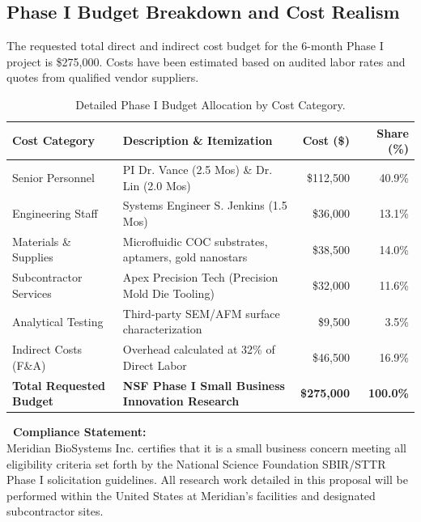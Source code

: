 \documentclass[11pt,a4paper]{scrartcl}
\begin{document}
\subsection{Phase I Budget Breakdown and Cost Realism}

The requested total direct and indirect cost budget for the 6-month Phase I project is \$275,000. Costs have been estimated based on audited labor rates and quotes from qualified vendor suppliers.

\begin{table}[htbp]
\centering
\small
\caption{Detailed Phase I Budget Allocation by Cost Category.}
\vspace{2pt}
\begin{tabularx}{\textwidth}{X X r r}
\toprule
\textbf{\textcolor{NavyBlue}{Cost Category}} & \textbf{\textcolor{NavyBlue}{Description \& Itemization}} & \textbf{\textcolor{NavyBlue}{Cost (\$)}} & \textbf{\textcolor{NavyBlue}{Share (\%)}} \\
\midrule
Senior Personnel & PI Dr. Vance (2.5 Mos) \& Dr. Lin (2.0 Mos) & \$112,500 & 40.9\% \\{}
Engineering Staff & Systems Engineer S. Jenkins (1.5 Mos) & \$36,000 & 13.1\% \\{}
Materials \& Supplies & Microfluidic COC substrates, aptamers, gold nanostars & \$38,500 & 14.0\% \\{}
Subcontractor Services & Apex Precision Tech (Precision Mold Die Tooling) & \$32,000 & 11.6\% \\{}
Analytical Testing & Third-party SEM/AFM surface characterization & \$9,500 & 3.5\% \\{}
Indirect Costs (F\&A) & Overhead calculated at 32\% of Direct Labor & \$46,500 & 16.9\% \\
\midrule
\textbf{Total Requested Budget} & \textbf{NSF Phase I Small Business Innovation Research} & \textbf{\$275,000} & \textbf{100.0\%} \\
\bottomrule
\end{tabularx}
\end{table}

\vspace{3pt}
\begin{tcolorbox}[proposalcard]
\small
\textbf{\faCheckCircle\ Compliance Statement:}\\
Meridian BioSystems Inc. certifies that it is a small business concern meeting all eligibility criteria set forth by the National Science Foundation SBIR/STTR Phase I solicitation guidelines. All research work detailed in this proposal will be performed within the United States at Meridian's facilities and designated subcontractor sites.
\end{tcolorbox}
\end{document}
